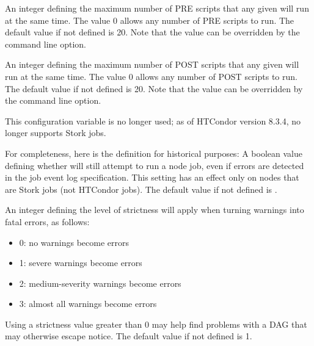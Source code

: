 \begin{description}
\label{param:DAGManMaxPreScripts}
\item[\Macro{DAGMAN\_MAX\_PRE\_SCRIPTS}]
  An integer defining the maximum number of PRE scripts that any given
   will run at the same time.  
  The value 0 allows any number of PRE scripts to run.
  The default value if not defined is 20.
  Note that the  value can be overridden
  by the   command line option.

\label{param:DAGManMaxPostScripts}
\item[\Macro{DAGMAN\_MAX\_POST\_SCRIPTS}]
  An integer defining the maximum number of POST scripts that any given
   will run at the same time.
  The value 0 allows any number of POST scripts to run.
  The default value if not defined is 20.
  Note that the  value can be overridden
  by the   command line option.

\label{param:DAGManAllowLogError}
\item[\Macro{DAGMAN\_ALLOW\_LOG\_ERROR}]
  This configuration variable is no longer used; 
  as of HTCondor version 8.3.4,  no longer supports Stork jobs.

  For completeness, here is the definition for historical purposes: 
  A boolean value defining whether  will still attempt
  to run a node job, even if errors are detected in the job event log
  specification.  This setting has an effect only on nodes that are
  Stork jobs (not HTCondor jobs).  The default value if not defined is
  .

\label{param:DAGManUseStrict}
\item[\Macro{DAGMAN\_USE\_STRICT}]
  An integer defining the level of strictness  will apply
  when turning warnings into fatal errors, as follows:
  \begin{itemize}
    \item 0: no warnings become errors
    \item 1: severe warnings become errors
    \item 2: medium-severity warnings become errors
    \item 3: almost all warnings become errors
  \end{itemize}
  Using a strictness value greater than 0 may help find problems with
  a DAG that may otherwise escape notice.
  The default value if not defined is 1.


\end{description}

